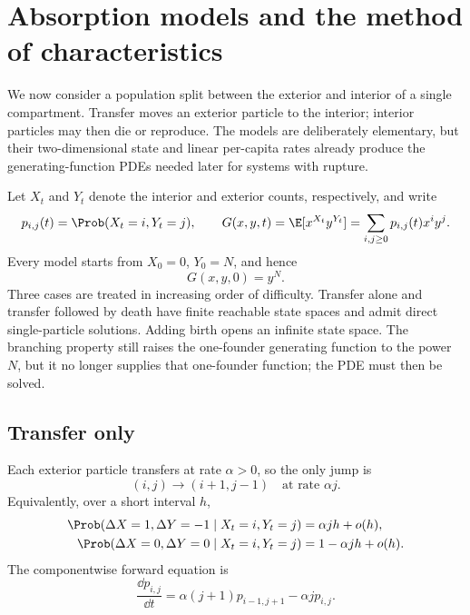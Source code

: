 \section{Absorption models and the method of characteristics}
\label{sec:characteristics}

We now consider a population split between the exterior and interior of a single
compartment.  Transfer moves an exterior particle to the interior; interior
particles may then die or reproduce.  The models are deliberately elementary, but
their two-dimensional state and linear per-capita rates already produce the
generating-function PDEs needed later for systems with rupture.

Let \(X_t\) and \(Y_t\) denote the interior and exterior counts, respectively, and
write
\begin{equation}
  p_{i,j}(t)=\Prob(X_t=i,Y_t=j),
  \qquad
  G(x,y,t)=\E[x^{X_t}y^{Y_t}]
  =\sum_{i,j\geq0}p_{i,j}(t)x^iy^j.
  \label{eq:absorption-pgf-definition}
\end{equation}
Every model starts from \(X_0=0\), \(Y_0=N\), and hence
\begin{equation}
  G(x,y,0)=y^N.
  \label{eq:absorption-initial-pgf}
\end{equation}
Three cases are treated in increasing order of difficulty.  Transfer alone and
transfer followed by death have finite reachable state spaces and admit direct
single-particle solutions.  Adding birth opens an infinite state space.  The
branching property still raises the one-founder generating function to the power
\(N\), but it no longer supplies that one-founder function; the PDE must then be
solved.

\subsection{Transfer only}
\label{sec:transfer-only}

Each exterior particle transfers at rate \(\alpha>0\), so the only jump is
\begin{equation}
  (i,j)\longrightarrow(i+1,j-1)
  \quad\text{at rate }\alpha j.
  \label{eq:transfer-only-rate}
\end{equation}
Equivalently, over a short interval \(h\),
\begin{align}
  \Prob(\Delta X=1,\Delta Y=-1\mid X_t=i,Y_t=j)
    &=\alpha jh+o(h),
  \notag\\
  \Prob(\Delta X=0,\Delta Y=0\mid X_t=i,Y_t=j)
    &=1-\alpha jh+o(h).
  \label{eq:transfer-only-short-time}
\end{align}
The componentwise forward equation is
\begin{equation}
  \frac{\dd p_{i,j}}{\dd t}
  =\alpha(j+1)p_{i-1,j+1}-\alpha jp_{i,j}.
  \label{eq:transfer-only-forward}
\end{equation}

